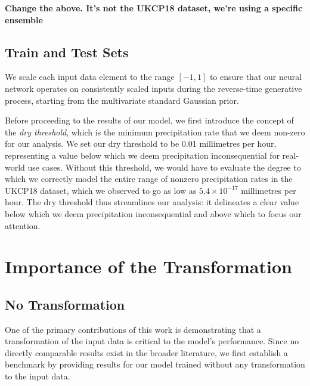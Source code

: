 \documentclass[ oneside,%
                    author={George Herbert},
                    degree={MSci},
                     title={Video Diffusion Models for Climate Simulations},
                  subtitle={}]{dissertation}
\begin{document}
\textbf{Change the above. It's not the UKCP18 dataset, we're using a specific ensemble}

\subsection{Train and Test Sets}
\label{sec:results_dataset_train_test}

We scale each input data element to the range $[-1,1]$ to ensure that our neural network operates on consistently scaled inputs during the reverse-time generative process, starting from the multivariate standard Gaussian prior.

Before proceeding to the results of our model, we first introduce the concept of the \textit{dry threshold}, which is the minimum precipitation rate that we deem non-zero for our analysis. We set our dry threshold to be 0.01 millimetres per hour, representing a value below which we deem precipitation inconsequential for real-world use cases. Without this threshold, we would have to evaluate the degree to which we correctly model the entire range of nonzero precipitation rates in the UKCP18 dataset, which we observed to go as low as $5.4\times 10^{-17}$ millimetres per hour. The dry threshold thus streamlines our analysis: it delineates a clear value below which we deem precipitation inconsequential and above which to focus our attention.

\section{Importance of the Transformation}
\label{sec:results_importance_of_transformation}

\subsection{No Transformation}
\label{sec:results_no_transformation}

One of the primary contributions of this work is demonstrating that a transformation of the input data is critical to the model's performance. Since no directly comparable results exist in the broader literature, we first establish a benchmark by providing results for our model trained without any transformation to the input data.
\end{document}
